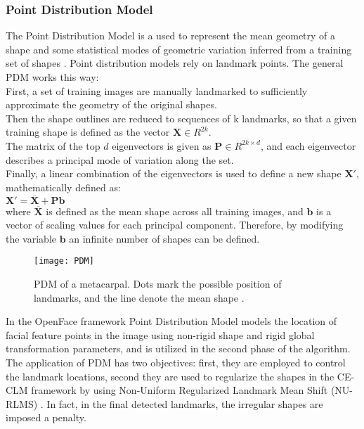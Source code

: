 \subsubsection{Point Distribution Model}
The Point Distribution Model is a used to represent the mean geometry of a shape and some statistical modes of geometric variation inferred from a training set of shapes \cite{wiki:PDM}. Point distribution models rely on landmark points. The general PDM works this way: \\
First, a set of training images are manually landmarked to sufficiently approximate the geometry of the original shapes.\\
Then the shape outlines are reduced to sequences of k landmarks, so that a given training shape is defined as the vector $\mathbf {X} \in {R} ^{2k}$.\\
The matrix of the top $d$ eigenvectors is given as $\mathbf {P} \in  {R}^{2k\times d}$, and each eigenvector describes a principal mode of variation along the set.\\
Finally, a linear combination of the eigenvectors is used to define a new shape $ \mathbf {X} '$, mathematically defined as: \\ 
$\mathbf {X}' = {\overline {\mathbf {X}} + \mathbf{P} \mathbf{b}}$ \\
where $ {\overline {\mathbf {X}}}$ is defined as the mean shape across all training images, and $\mathbf {b}$  is a vector of scaling values for each principal component. Therefore, by modifying the variable $\mathbf {b}$  an infinite number of shapes can be defined. \\

\begin{figure}[H]
	\centering
	\texttt{[image: PDM]}
	\caption{PDM of a metacarpal. Dots mark the possible position of landmarks, and the line denote the mean shape \cite{PDM}.}
	\label{fig:PDM}
\end{figure}

In the OpenFace framework Point Distribution Model \cite{PDM_RLMS} models the location of facial feature points in the image using non-rigid shape and rigid global transformation parameters, and is utilized in the second phase of the algorithm.\\
The application of PDM has two objectives: first, they are employed to control the landmark locations, second they are used to regularize the shapes in the CE-CLM framework by using	Non-Uniform Regularized Landmark Mean Shift (NU-RLMS) \cite{Baltru2013}. In fact, in the final detected landmarks, the irregular shapes are imposed a penalty. \\

